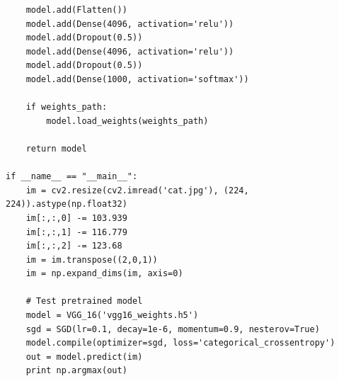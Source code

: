 \documentclass[12pt, a4paper, oneside, headinclude, footinclude]{article}
\begin{document}
\begin{verbatim}
    model.add(Flatten())
    model.add(Dense(4096, activation='relu'))
    model.add(Dropout(0.5))
    model.add(Dense(4096, activation='relu'))
    model.add(Dropout(0.5))
    model.add(Dense(1000, activation='softmax'))

    if weights_path:
        model.load_weights(weights_path)

    return model

if __name__ == "__main__":
    im = cv2.resize(cv2.imread('cat.jpg'), (224, 224)).astype(np.float32)
    im[:,:,0] -= 103.939
    im[:,:,1] -= 116.779
    im[:,:,2] -= 123.68
    im = im.transpose((2,0,1))
    im = np.expand_dims(im, axis=0)

    # Test pretrained model
    model = VGG_16('vgg16_weights.h5')
    sgd = SGD(lr=0.1, decay=1e-6, momentum=0.9, nesterov=True)
    model.compile(optimizer=sgd, loss='categorical_crossentropy')
    out = model.predict(im)
    print np.argmax(out)
\end{verbatim}

\renewcommand{\refname}{\spacedlowsmallcaps{References}} 





\end{document}

